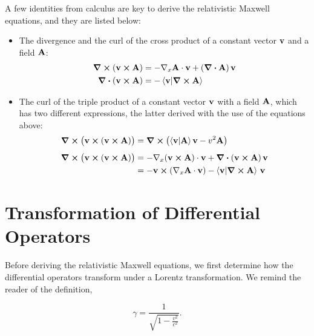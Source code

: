 \documentclass[12pt]{article}
\begin{document}
A few identities from calculus are key to derive the relativistic Maxwell equations, and they
are listed below:

\begin{itemize}
  \item The divergence and the curl of the cross product of a constant vector $\vb{v}$ and a
        field $\vb{A}$:
  \begin{equation}
    \begin{aligned}
      \curl(\vb{v} \cross \vb{A}) &= -\nabla_x \vb{A} \cdot \vb{v} + (\div \vb{A})\,\vb{v} \\
      \div(\vb{v} \cross \vb{A})  &= -\ip{\vb{v}}{\curl \vb{A}}
    \end{aligned}
    \label{eq:divergence_curl_cross_product}
  \end{equation}

  \item The curl of the triple product of a constant vector $\vb{v}$ with a field $\vb{A}$,
        which has two different expressions, the latter derived with the use of the equations
        above:
  \begin{equation}
    \begin{aligned}
      \curl\bigl(\vb{v} \cross (\vb{v} \cross \vb{A})\bigr)
        &= \curl\bigl(\ip{\vb{v}}{\vb{A}}\vb{v} - v^2\vb{A}\bigr) \\[4pt]
      \curl\bigl(\vb{v} \cross (\vb{v} \cross \vb{A})\bigr)
        &= -\nabla_x(\vb{v} \cross \vb{A}) \cdot \vb{v}
           + \div(\vb{v} \cross \vb{A})\,\vb{v} \\
        &= -\vb{v} \cross (\nabla_x \vb{A} \cdot \vb{v})
           - \ip{\vb{v}}{\curl \vb{A}}\,\vb{v}
    \end{aligned}
    \label{eq:curl_triple_product}
  \end{equation}
\end{itemize}

\section{Transformation of Differential Operators}

Before deriving the relativistic Maxwell equations, we first determine how the differential operators transform under a
Lorentz transformation. We remind the reader of the definition,

\[
\gamma=\frac{1}{\sqrt{1-\frac{v^2}{c^2}}}.
\]
\end{document}
